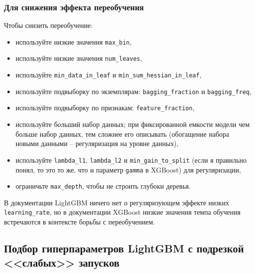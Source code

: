 \documentclass[%
	11pt,
	a4paper,
	utf8,
		]{article}
\begin{document}
\subsubsection{Для снижения эффекта переобучения}

Чтобы снизить переобучение:
\begin{itemize}
	\item используйте низкие значения \verb|max_bin|,
	
	\item используйте низкие значения \verb|num_leaves|,
	
	\item используйте \verb|min_data_in_leaf| и \verb|min_sum_hessian_in_leaf|,
	
	\item используйте подвыборку по экземплярам: \verb|bagging_fraction| и \verb|bagging_freq|,
	
	\item используйте подвыборку по признакам: \verb|feature_fraction|,
	
	\item используйте б\emph{о}льший набор данных; при фиксированной емкости модели чем больше набор данных, тем сложнее его описывать (обогащение набора новыми данными -- регуляризация на уровне данных),
	
	\item используйте \verb|lambda_l1|, \verb|lambda_l2| и \verb|min_gain_to_split| (если я правильно понял, то это то же, что и параметр \verb|gamma| в XGBoost) для регуляризации,
	
	\item ограничьте \verb|max_depth|, чтобы не строить глубоки деревья.
\end{itemize}

В документации LightGBM ничего нет о регуляризующем эффекте низких \verb|learning_rate|, но в документации XGBoost низкие значения темпа обучения встречаются в контексте борьбы с переобучением.


\subsection{Подбор гиперпараметров LightGBM с подрезкой <<слабых>> запусков}
\end{document}

